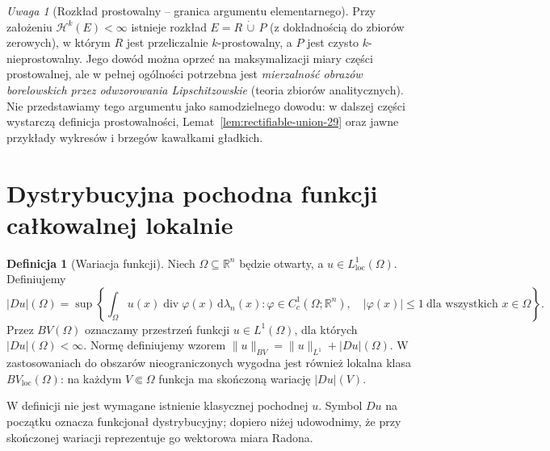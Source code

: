 \documentclass[11pt,a4paper,oneside]{book}
\numberwithin{equation}{chapter}
\theoremstyle{plain}
\theoremstyle{definition}
\newtheorem{definicja}[twierdzenie]{Definicja}
\theoremstyle{remark}
\newtheorem{uwaga}[twierdzenie]{Uwaga}
\begin{document}
\begin{uwaga}[Rozkład prostowalny -- granica argumentu elementarnego]
Przy założeniu $\mathcal H^k(E)<\infty$ istnieje rozkład
$E=R\,\dot\cup\,P$ (z dokładnością do zbiorów zerowych),
w którym $R$ jest przeliczalnie $k$-prostowalny,
a $P$ jest czysto $k$-nieprostowalny.
Jego dowód można oprzeć na maksymalizacji miary części
prostowalnej, ale w pełnej ogólności potrzebna jest
\emph{mierzalność obrazów borelowskich przez odwzorowania
Lipschitzowskie} (teoria zbiorów analitycznych).
Nie przedstawiamy tego argumentu jako samodzielnego dowodu:
w dalszej części wystarczą definicja prostowalności,
Lemat~\ref{lem:rectifiable-union-29} oraz jawne przykłady
wykresów i brzegów kawałkami gładkich.
\end{uwaga}

\section{Dystrybucyjna pochodna funkcji całkowalnej lokalnie}
\begin{definicja}[Wariacja funkcji]
\label{def:BV-variation-29}
Niech $\Omega\subseteq\mathbb R^n$ będzie otwarty,
a $u\in L^1_{\mathrm{loc}}(\Omega)$. Definiujemy
\[
 |Du|(\Omega)=\sup\left\{
 \int_\Omega u(x)\operatorname{div}\varphi(x)
   \,\mathrm d\lambda_n(x):
 \varphi\in C_c^1(\Omega;\mathbb R^n),\quad
 |\varphi(x)|\le1\ \text{dla wszystkich }x\in\Omega
 \right\}.
\]
Przez $BV(\Omega)$ oznaczamy przestrzeń
funkcji $u\in L^1(\Omega)$, dla których
$|Du|(\Omega)<\infty$. Normę definiujemy wzorem
$\|u\|_{BV}=\|u\|_{L^1}+|Du|(\Omega)$.
W zastosowaniach do obszarów nieograniczonych
wygodna jest również lokalna klasa $BV_{\mathrm{loc}}(\Omega)$:
na każdym $V\Subset\Omega$ funkcja ma skończoną
wariację $|Du|(V)$.
\end{definicja}

W definicji nie jest wymagane istnienie klasycznej
pochodnej $u$. Symbol $Du$ na początku oznacza
funkcjonał dystrybucyjny; dopiero niżej udowodnimy,
że przy skończonej wariacji reprezentuje go
wektorowa miara Radona.
\end{document}
